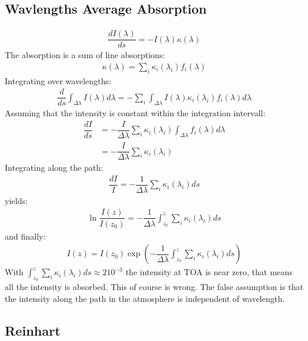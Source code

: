 \subsection{Wavlengths Average Absorption}

\begin{align}
	\dfrac{d I(\lambda)}{ds} = - I(\lambda) \kappa(\lambda)
\end{align}
The absorption is a sum of line absorptions:
\begin{align}
	\kappa(\lambda) = \sum_i \kappa_i(\lambda_i) f_i(\lambda)
\end{align}
Integrating over wavelengths:
\begin{align}
	\dfrac{d}{ds} \int_{\Delta \lambda} I(\lambda) d \lambda = - \sum_i  \int_{\Delta \lambda} I(\lambda) \kappa_i(\lambda_i) f_i(\lambda)  d \lambda
\end{align}
Assuming that the intensity is constant within the integration intervall:
\begin{align}
    \dfrac{d I}{ds} &= - \dfrac{I}{\Delta \lambda} \sum_i \kappa_i(\lambda_i)  \int_{\Delta \lambda}  f_i(\lambda)  d \lambda \\
                    &= - \dfrac{I}{\Delta \lambda} \sum_i \kappa_i(\lambda_i)
\end{align}
Integrating along the path:
\begin{align}
	\dfrac{dI}{I} = - \dfrac{1}{\Delta \lambda} \sum_i \kappa_i(\lambda_i) ds
\end{align}
yields:
\begin{align}
	\ln \dfrac{I(z)}{I(z_0)} = - \dfrac{1}{\Delta \lambda} \int_{z_0}^{z} \sum_i \kappa_i(\lambda_i) ds
\end{align}
and finally:
\begin{align}
	I(z) = I(z_0) \exp\left( - \dfrac{1}{\Delta \lambda} \int_{z_0}^{z} \sum_i \kappa_i(\lambda_i) ds \right)
\end{align}
With $\int_{z_0}^{z} \sum_i \kappa_i(\lambda_i) ds \approx 2 10^{-3}$ the intensity at TOA is near zero, that means all the intensity is absorbed.
This of course is wrong. The false assumption is that the intensity along the path in the atmosphere is independent of wavelength.

\subsection{Reinhart}


